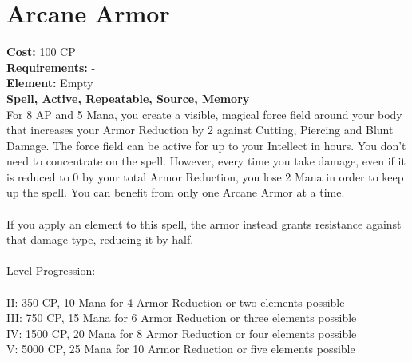 \section{Arcane Armor}
\textbf{Cost:} 100 CP\\
\textbf{Requirements:} -\\
\textbf{Element:} Empty\\
\textbf{Spell, Active, Repeatable, Source, Memory}\\
For 8 AP and 5 Mana, you create a visible, magical force field around your body that increases your Armor Reduction by 2 against Cutting, Piercing and Blunt Damage. The force field can be active for up to your Intellect in hours. You don’t need to concentrate on the spell. However, every time you take damage, even if it is reduced to 0 by your total Armor Reduction, you lose 2 Mana in order to keep up the spell. You can benefit from only one Arcane Armor at a time.\\
\\
If you apply an element to this spell, the armor instead grants resistance against that damage type, reducing it by half.\\
\\
Level Progression:\\
\\
II: 350 CP, 10 Mana for 4 Armor Reduction or two elements possible\\
III: 750 CP, 15 Mana for 6 Armor Reduction or three elements possible\\
IV: 1500 CP, 20 Mana for 8 Armor Reduction or four elements possible\\
V: 5000 CP, 25 Mana for 10 Armor Reduction or five elements possible\\